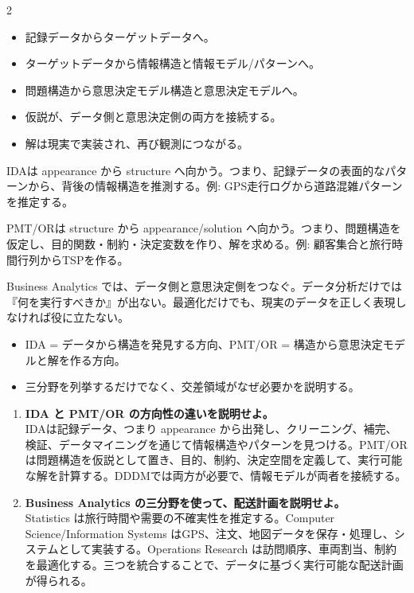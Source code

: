 \clearpage
{}
\begin{multicols}{2}\footnotesize\raggedcolumns
{}
\begin{itemize}
\item 記録データからターゲットデータへ。
\item ターゲットデータから情報構造と情報モデル/パターンへ。
\item 問題構造から意思決定モデル構造と意思決定モデルへ。
\item 仮説が、データ側と意思決定側の両方を接続する。
\item 解は現実で実装され、再び観測につながる。
\end{itemize}
IDAは appearance から structure へ向かう。つまり、記録データの表面的なパターンから、背後の情報構造を推測する。例: GPS走行ログから道路混雑パターンを推定する。\par

PMT/ORは structure から appearance/solution へ向かう。つまり、問題構造を仮定し、目的関数・制約・決定変数を作り、解を求める。例: 顧客集合と旅行時間行列からTSPを作る。\par

Business Analytics では、データ側と意思決定側をつなぐ。データ分析だけでは『何を実行すべきか』が出ない。最適化だけでも、現実のデータを正しく表現しなければ役に立たない。\par
{}
\begin{itemize}
\item IDA = データから構造を発見する方向、PMT/OR = 構造から意思決定モデルと解を作る方向。
\item 三分野を列挙するだけでなく、交差領域がなぜ必要かを説明する。
\end{itemize}
\begin{enumerate}
\item \textbf{IDA と PMT/OR の方向性の違いを説明せよ。}\\IDAは記録データ、つまり appearance から出発し、クリーニング、補完、検証、データマイニングを通じて情報構造やパターンを見つける。PMT/ORは問題構造を仮説として置き、目的、制約、決定空間を定義して、実行可能な解を計算する。DDDMでは両方が必要で、情報モデルが両者を接続する。
\item \textbf{Business Analytics の三分野を使って、配送計画を説明せよ。}\\Statistics は旅行時間や需要の不確実性を推定する。Computer Science/Information Systems はGPS、注文、地図データを保存・処理し、システムとして実装する。Operations Research は訪問順序、車両割当、制約を最適化する。三つを統合することで、データに基づく実行可能な配送計画が得られる。
\end{enumerate}
\end{multicols}

